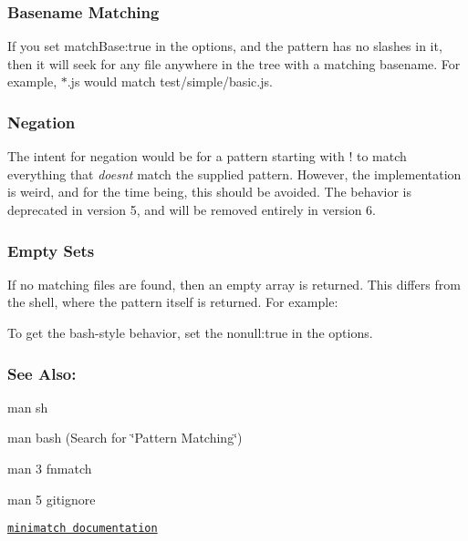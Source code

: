 \subsubsection*{Basename Matching}

If you set {\ttfamily match\+Base\+:true} in the options, and the pattern has no slashes in it, then it will seek for any file anywhere in the tree with a matching basename. For example, {\ttfamily $\ast$.js} would match {\ttfamily test/simple/basic.\+js}.

\subsubsection*{Negation}

The intent for negation would be for a pattern starting with {\ttfamily !} to match everything that {\itshape doesn\textquotesingle{}t} match the supplied pattern. However, the implementation is weird, and for the time being, this should be avoided. The behavior is deprecated in version 5, and will be removed entirely in version 6.

\subsubsection*{Empty Sets}

If no matching files are found, then an empty array is returned. This differs from the shell, where the pattern itself is returned. For example\+: 


To get the bash-\/style behavior, set the {\ttfamily nonull\+:true} in the options.

\subsubsection*{See Also\+:}


\begin{DoxyItemize}
\item {\ttfamily man sh}
\item {\ttfamily man bash} (Search for \char`\"{}\+Pattern Matching\char`\"{})
\item {\ttfamily man 3 fnmatch}
\item {\ttfamily man 5 gitignore}
\item \href{https://github.com/isaacs/minimatch}{\tt minimatch documentation}
\end{DoxyItemize}

